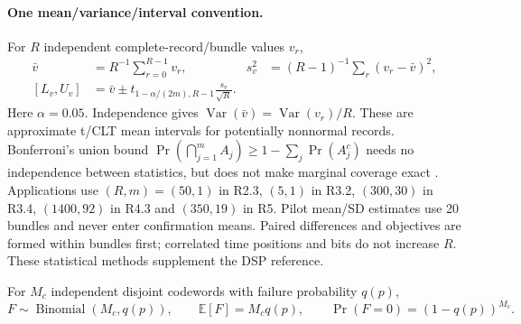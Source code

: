 \paragraph{One mean/variance/interval convention.}
For $R$ independent complete-record/bundle values $v_r$,
\begin{align}
 \bar v&=R^{-1}\sum_{r=0}^{R-1}v_r,&
 s_v^2&=(R-1)^{-1}\sum_r(v_r-\bar v)^2,\\
 [L_v,U_v]&=\bar v\pm t_{1-\alpha/(2m),R-1}\frac{s_v}{\sqrt R}.
 \label{eq:app-mean-interval}
\end{align}
Here $\alpha=0.05$. Independence gives
$\operatorname{Var}(\bar v)=\operatorname{Var}(v_r)/R$.
These are approximate t/CLT mean intervals for potentially nonnormal
records. Bonferroni's union bound
$\Pr(\bigcap_{j=1}^mA_j)\ge1-\sum_j\Pr(A_j^c)$ needs no independence
between statistics, but does not make marginal coverage exact
\citep{nistmeaninterval,nistbonferroni,dunn1961comparisons,scipy1153t,scipy1153sem}.
Applications use $(R,m)=(50,1)$ in R2.3, $(5,1)$ in R3.2,
$(300,30)$ in R3.4, $(1400,92)$ in R4.3 and $(350,19)$ in R5.
Pilot mean/SD estimates use 20 bundles and never enter confirmation means.
Paired differences and objectives are formed within bundles first;
correlated time positions and bits do not increase $R$.
These statistical methods supplement the DSP reference.

For $M_c$ independent disjoint codewords with failure probability $q(p)$,
\begin{equation}
 F\sim\operatorname{Binomial}(M_c,q(p)),\qquad
 \mathbb E[F]=M_cq(p),\qquad
 \Pr(F=0)=(1-q(p))^{M_c}.
 \label{eq:r33-exposure}
\end{equation}

